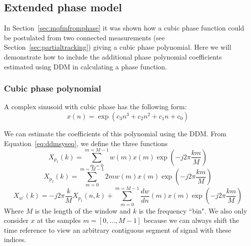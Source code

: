\documentclass[letterpaper,12pt]{report}
\begin{document}
\subsection{Extended phase model}

In Section~\ref{sec:mqfmfromphase} it was shown how a cubic phase function could
be postulated from two connected measurements (see
Section~\ref{sec:partialtracking}) giving a cubic phase polynomial. Here we will
demonstrate how to include the additional phase polynomial coefficients
estimated using DDM in calculating a phase function.

\subsubsection{Cubic phase polynomial}

A complex sinusoid with cubic phase has the following form:
\[
    x(n) = \exp \left(c_3 n^{3} + c_2 n^{2} + c_1 n + c_0 \right)
\]

We can estimate the coefficients of this polynomial using the DDM. From
Equation~\ref{eq:ddmsyseq}, we define the three functions
\begin{equation}
    X_{p_{1}} \left(k \right)
    =
    \sum_{m=0}^{m=M-1} w(m) x(m) \exp(-j 2 \pi \frac{k m}{M})
\end{equation}
\begin{equation}
    X_{p_{2}} \left(k \right)
    =
    \sum_{m=0}^{m=M-1} 2 m w(m) x(m) \exp(-j 2 \pi \frac{k m}{M})
\end{equation}
\begin{equation}
    X_{w^{\prime}} \left(k \right)
    =
    -j 2 \pi \frac{k}{M} X_{p_{1}} \left(n, k \right)+ 
    \sum_{m=0}^{m=M-1} \frac{dw}{dn}(m) x(m) \exp(-j 2 \pi \frac{k m}{M})
\end{equation}
Where $M$ is the length of the window and $k$ is the frequency ``bin". We also
only consider $x$ at the samples $m = [0, \dotsc, M-1]$ because we can always
shift the time reference to view an arbitrary contiguous segment of signal with
these indices.
\end{document}
